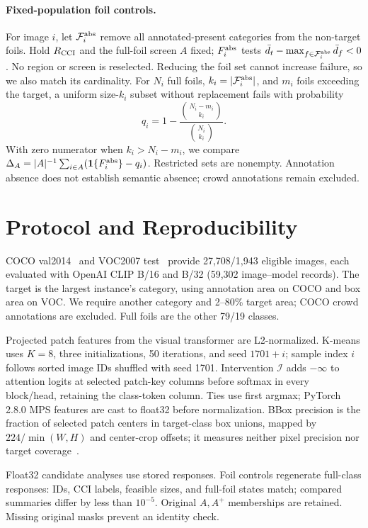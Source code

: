 \documentclass[10pt]{article}
\newcommand{\foils}{\mathcal F}
\begin{document}
\paragraph{Fixed-population foil controls.}
For image $i$, let $\foils_i^{\rm abs}$ remove all annotated-present categories
from the non-target foils. Hold $R_{\rm CCI}$ and the full-foil screen $A$ fixed;
$F_i^{\rm abs}$ tests $\bar d_t-\max_{f\in\foils_i^{\rm abs}}\bar d_f<0$.
No region or screen is reselected. Reducing the foil set cannot increase
failure, so we also match its cardinality. For $N_i$ full
foils, $k_i=|\foils_i^{\rm abs}|$, and $m_i$ foils exceeding the target,
a uniform size-$k_i$ subset without replacement fails with probability
\begin{equation}
q_i=1-\frac{\binom{N_i-m_i}{k_i}}{\binom{N_i}{k_i}}.
\label{eq:matched}
\end{equation}
With zero numerator when $k_i>N_i-m_i$, we compare
$\Delta_A=|A|^{-1}\sum_{i\in A}(\mathbf1\{F_i^{\rm abs}\}-q_i)$.
Restricted sets are nonempty. Annotation absence does not establish semantic
absence; crowd annotations remain excluded.

\section{Protocol and Reproducibility}
COCO val2014~\cite{lin2014coco} and VOC2007 test~\cite{everingham2010voc}
provide 27,708/1,943 eligible images, each evaluated with OpenAI CLIP B/16
and B/32 (59,302 image--model records). The target is the largest instance's
category, using annotation area on COCO and box area on VOC. We require
another category and 2--80\% target area; COCO crowd annotations are excluded.
Full foils are the other 79/19 classes.

Projected patch features from the visual transformer are L2-normalized. K-means uses
$K=8$, three initializations, 50 iterations, and seed $1701+i$; sample index
$i$ follows sorted image IDs shuffled with seed 1701. Intervention $\mathcal I$
adds $-\infty$ to attention logits at selected patch-key columns before
softmax in every block/head, retaining the class-token column. Ties use first argmax;
PyTorch 2.8.0 MPS features are cast to float32 before normalization.
BBox precision is the fraction of selected patch centers in target-class box unions,
mapped by $224/\min(W,H)$ and center-crop offsets; it measures neither pixel
precision nor target coverage~\cite{gomez2022metrics}.

Float32 candidate analyses use stored responses. Foil controls regenerate
full-class responses: IDs, CCI labels, feasible sizes, and full-foil states
match; compared summaries differ by less than $10^{-5}$. Original $A,A^+$
memberships are retained. Missing original masks prevent an identity check.
\end{document}
